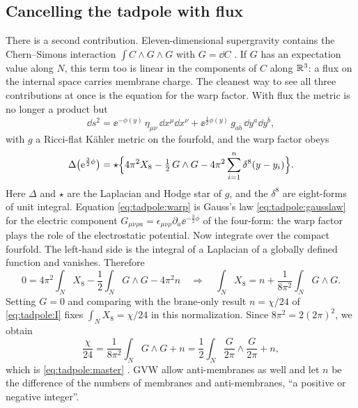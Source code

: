 \subsection{Cancelling the tadpole with flux}
There is a second contribution. Eleven-dimensional supergravity contains the Chern--Simons
interaction $\int C\wedge G\wedge G$ with $G=\dd C$ .
If $G$ has an expectation value along $N$, this term too is linear in the components of $C$
along $\mathbb{R}^3$: a flux on the internal space carries membrane charge. The cleanest way to see
all three contributions at once is the equation for the warp factor. With flux the metric is
no longer a product but
\begin{equation}\label{eq:tadpole:metric}
 \dd s^2=\ee^{-\phi(y)}\,\eta_{\mu\nu}\,\dd x^\mu\dd x^\nu
 +\ee^{\frac12\phi(y)}\,g_{a\bar b}\,\dd y^a\dd y^{\bar b},
\end{equation}
with $g$ a Ricci-flat K\"ahler metric on the fourfold, and the warp factor obeys
\begin{equation}\label{eq:tadpole:warp}
 \Delta\bigl(\mathrm{e}^{\frac32\phi}\bigr)=\star\Bigl\{4\pi^2X_8-\tfrac12\,G\wedge G
 -4\pi^2\sum_{i=1}^{n}\delta^8(y-y_i)\Bigr\}.
\end{equation}
Here $\Delta$ and $\star$ are the Laplacian and Hodge star of $g$, and the $\delta^8$ are
eight-forms of unit integral. Equation \eqref{eq:tadpole:warp} is Gauss's law
\eqref{eq:tadpole:gausslaw} for the electric component
$G_{\mu\nu\rho a}=\epsilon_{\mu\nu\rho}\partial_a\ee^{-\frac32\phi}$ of the four-form: the
warp factor plays the role of the electrostatic potential. Now integrate over the compact
fourfold. The left-hand side is the integral of a Laplacian of a globally defined function
and vanishes. Therefore
\begin{equation}\label{eq:tadpole:integrated}
 0=4\pi^2\int_N X_8-\frac12\int_N G\wedge G-4\pi^2 n
 \quad\Longrightarrow\quad
 \int_NX_8=n+\frac{1}{8\pi^2}\int_NG\wedge G .
\end{equation}
Setting $G=0$ and comparing with the brane-only result $n=\chi/24$ of
\eqref{eq:tadpole:I} fixes $\int_NX_8=\chi/24$ in this normalization. Since
$8\pi^2=2(2\pi)^2$, we obtain
\begin{equation}\label{eq:tadpole:drs}
 \frac{\chi}{24}=\frac{1}{8\pi^2}\int_N G\wedge G+n
 =\frac12\int_N\frac{G}{2\pi}\wedge\frac{G}{2\pi}+n ,
\end{equation}
which is \eqref{eq:tadpole:master} . GVW allow anti-membranes as well and let $n$ be the difference of
the numbers of membranes and anti-membranes, ``a positive or negative integer''. \TL

